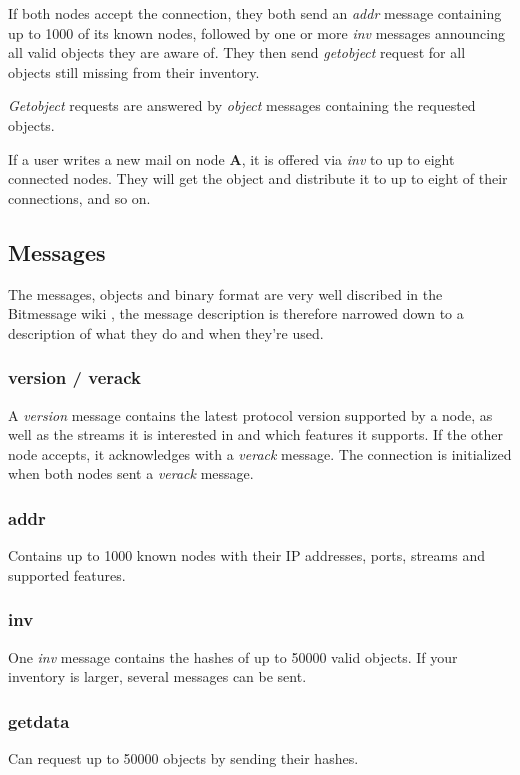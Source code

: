 \documentclass{bfh}
\newcommand{\msg}[1]{\textit{#1}}
\newcommand{\node}[1]{\textbf{#1}}
\begin{document}
  If both nodes accept the connection, they both send an \msg{addr} message containing up to 1000 of its known nodes, followed by one or more \msg{inv} messages announcing all valid objects they are aware of. They then send \msg{getobject} request for all objects still missing from their inventory.

  \msg{Getobject} requests are answered by \msg{object} messages containing the requested objects.

  If a user writes a new mail on node \node{A}, it is offered via \msg{inv} to up to eight connected nodes. They will get the object and distribute it to up to eight of their connections, and so on.

  \subsection{Messages}

  The messages, objects and binary format are very well discribed in the Bitmessage wiki \cite{wiki:protocol}, the message description is therefore narrowed down to a description of what they do and when they're used.

  \subsubsection{version / verack}
  A \msg{version} message contains the latest protocol version supported by a node, as well as the streams it is interested in and which features it supports. If the other node accepts, it acknowledges with a \msg{verack} message. The connection is initialized when both nodes sent a \msg{verack} message.

  \subsubsection{addr}
  Contains up to 1000 known nodes with their IP addresses, ports, streams and supported features.

  \subsubsection{inv}
  One \msg{inv} message contains the hashes of up to 50000 valid objects. If your inventory is larger, several messages can be sent.

  \subsubsection{getdata}
  Can request up to 50000 objects by sending their hashes.
\end{document}

